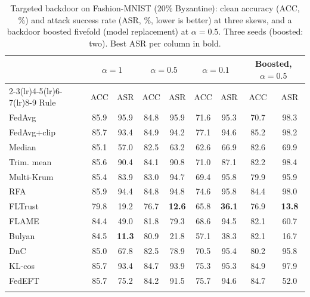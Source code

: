\begin{table}[!tbp]
\centering
\caption{Targeted backdoor on Fashion-MNIST (20\% Byzantine): clean accuracy (ACC, \%) and attack success rate (ASR, \%, lower is better) at three skews, and a backdoor boosted fivefold (model replacement) at $\alpha=0.5$. Three seeds (boosted: two). Best ASR per column in bold.}
\label{tab:backdoor}
\setlength{\tabcolsep}{3.0pt}
\footnotesize
\begin{tabular}{@{}lcccccccc@{}}
\toprule
 & \multicolumn{2}{c}{$\alpha=1$} & \multicolumn{2}{c}{$\alpha=0.5$} & \multicolumn{2}{c}{$\alpha=0.1$} & \multicolumn{2}{c}{Boosted, $\alpha=0.5$}\\
\cmidrule(lr){2-3}\cmidrule(lr){4-5}\cmidrule(lr){6-7}\cmidrule(lr){8-9}
Rule & ACC & ASR & ACC & ASR & ACC & ASR & ACC & ASR\\
\midrule
FedAvg & 85.9 & 95.9 & 84.8 & 95.9 & 71.6 & 95.3 & 70.7 & 98.3\\
FedAvg+clip & 85.7 & 93.4 & 84.9 & 94.2 & 77.1 & 94.6 & 85.2 & 98.2\\
Median & 85.1 & 57.0 & 82.5 & 63.2 & 62.6 & 66.9 & 82.6 & 69.9\\
Trim. mean & 85.6 & 90.4 & 84.1 & 90.8 & 71.0 & 87.1 & 82.2 & 98.4\\
Multi-Krum & 85.4 & 83.9 & 83.0 & 94.7 & 69.4 & 95.8 & 79.9 & 95.9\\
RFA & 85.9 & 94.4 & 84.8 & 94.8 & 74.6 & 95.8 & 84.4 & 98.0\\
FLTrust & 79.8 & 19.2 & 76.7 & \textbf{12.6} & 65.8 & \textbf{36.1} & 76.9 & \textbf{13.8}\\
FLAME & 84.4 & 49.0 & 81.8 & 79.3 & 68.6 & 94.5 & 82.1 & 60.7\\
Bulyan & 84.5 & \textbf{11.3} & 80.9 & 21.8 & 57.1 & 38.3 & 82.1 & 16.7\\
DnC & 85.0 & 67.8 & 82.5 & 78.9 & 70.5 & 95.4 & 80.2 & 95.8\\
KL-cos & 85.7 & 93.4 & 84.7 & 93.9 & 75.3 & 95.3 & 84.9 & 97.9\\
\midrule
FedEFT & 85.7 & 75.2 & 84.2 & 91.5 & 75.7 & 94.6 & 84.7 & 52.0\\
\botrule
\end{tabular}
\end{table}
